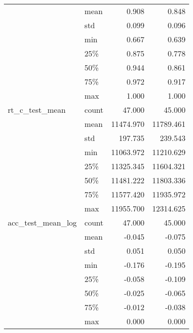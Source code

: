 \begin{tabular}{llrr}
                  & mean &         0.908 &         0.848 \\
                  & std &         0.099 &         0.096 \\
                  & min &         0.667 &         0.639 \\
                  & 25\% &         0.875 &         0.778 \\
                  & 50\% &         0.944 &         0.861 \\
                  & 75\% &         0.972 &         0.917 \\
                  & max &         1.000 &         1.000 \\
rt\_c\_test\_mean & count &        47.000 &        45.000 \\
                  & mean &     11474.970 &     11789.461 \\
                  & std &       197.735 &       239.543 \\
                  & min &     11063.972 &     11210.629 \\
                  & 25\% &     11325.345 &     11604.321 \\
                  & 50\% &     11481.222 &     11803.336 \\
                  & 75\% &     11577.420 &     11935.972 \\
                  & max &     11955.700 &     12314.625 \\
acc\_test\_mean\_log & count &        47.000 &        45.000 \\
                  & mean &        -0.045 &        -0.075 \\
                  & std &         0.051 &         0.050 \\
                  & min &        -0.176 &        -0.195 \\
                  & 25\% &        -0.058 &        -0.109 \\
                  & 50\% &        -0.025 &        -0.065 \\
                  & 75\% &        -0.012 &        -0.038 \\
                  & max &         0.000 &         0.000 \\
\bottomrule
\end{tabular}
